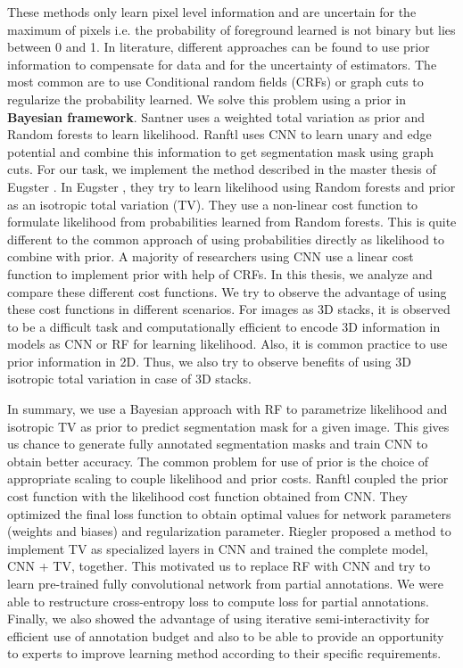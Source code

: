 These methods only learn pixel level information and are uncertain for the maximum of pixels i.e. the probability of foreground learned is not binary but lies between 0 and 1. In literature, different approaches can be found to use prior information to compensate for data and for the uncertainty of estimators. The most common are to use Conditional random fields (CRFs) or graph cuts to regularize the probability learned. We solve this problem using a prior in \textbf{Bayesian framework}. Santner \cite{santner:2009} uses a weighted total variation as prior and Random forests to learn likelihood. Ranftl \cite{ranftl:2014} uses CNN to learn unary and edge potential and combine this information to get segmentation mask using graph cuts. For our task, we implement the method described in the master thesis of Eugster \cite{dominic}. In Eugster \cite{dominic}, they try to learn likelihood using Random forests and prior as an isotropic total variation (TV). They use a non-linear cost function to formulate likelihood from probabilities learned from Random forests. This is quite different to the common approach of using probabilities directly as likelihood to combine with prior. A majority of researchers using CNN use a linear cost function to implement prior with help of CRFs. In this thesis, we analyze and compare these different cost functions. We try to observe the advantage of using these cost functions in different scenarios. For images as 3D stacks, it is observed to be a difficult task and computationally efficient to encode 3D information in models as CNN or RF for learning likelihood. Also, it is common practice to use prior information in 2D. Thus, we also try to observe benefits of using 3D isotropic total variation in case of 3D stacks. \par

In summary, we use a Bayesian approach with RF to parametrize likelihood and isotropic TV as prior to predict segmentation mask for a given image. This gives us chance to generate fully annotated segmentation masks and train CNN to obtain better accuracy. The common problem for use of prior is the choice of appropriate scaling to couple likelihood and prior costs. Ranftl \cite{ranftl:2014} coupled the prior cost function with the likelihood cost function obtained from CNN. They optimized the final loss function to obtain optimal values for network parameters (weights and biases) and regularization parameter. Riegler \cite{riegler:2016} \cite{riegler1:2016} proposed a method to implement TV as specialized layers in CNN and trained the complete model, CNN + TV, together. This motivated us to replace RF with CNN and try to learn pre-trained fully convolutional network from partial annotations. We were able to restructure cross-entropy loss to compute loss for partial annotations. \newline
Finally, we also showed the advantage of using iterative semi-interactivity for efficient use of annotation budget and also to be able to provide an opportunity to experts to improve learning method according to their specific requirements.

